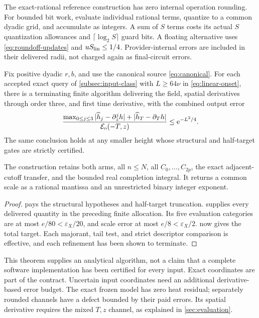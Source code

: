 The exact-rational reference construction has zero internal operation
rounding. For bounded bit work, evaluate individual rational terms,
quantize to a common dyadic grid, and accumulate as integers. A sum of
\(S\) terms costs its actual \(S\) quantization allowances and
\(\lceil\log_2S\rceil\) guard bits. A floating alternative uses
\eqref{eq:roundoff-updates} and \(uS_{\rm lin}\le1/4\).
Provider-internal errors are included in their delivered radii, not
charged again as final-circuit errors.

\begin{theorem}\label{thm:effective}
Fix positive dyadic \(r,b\), and use the canonical source
\eqref{eq:canonical}. For each accepted exact query of
\cref{subsec:input-class} with \(L\ge64\nu\) in
\eqref{eq:linear-onset}, there is a terminating finite algorithm
delivering the field, spatial derivatives through order three, and first
time derivative, with the combined output error
\[
 \frac{\max_{0\le j\le3}|\widehat h_j-\partial_z^jh|
          +|\widehat h_T-\partial_Th|}{\mathcal E_{\mathrm o}(-T,z)}
 \le\mathrm e^{-L^2/4}.
\] The same conclusion holds at any smaller height
whose structural and half-target gates are strictly certified.

The construction retains both arms, all \(n\le N\), all
\(C_0,\ldots,C_{2p}\), the exact adjacent-cutoff transfer, and the
bounded real completion integral. It returns a common scale as a
rational mantissa and an unrestricted binary integer exponent.
\end{theorem}
\begin{proof}
 pays the structural hypotheses and half-target
truncation.  supplies every delivered quantity in
the preceding finite allocation. Its five evaluation categories are
at most \(e/80<\varepsilon_X/20\), and scale error at most
\(e/8<\varepsilon_X/2\).  now gives the total
target. Each majorant, tail test, and strict descriptor comparison is
effective, and each refinement has been shown to terminate.
\end{proof}

This theorem supplies an analytical algorithm, not a claim that a
complete software implementation has been certified for every input.
Exact coordinates are part of the contract. Uncertain input coordinates
need an additional derivative-based error budget. The exact frozen model
has zero heat residual; separately rounded channels have a defect bounded
by their paid errors. Its spatial derivative requires the mixed \(T,z\)
channel, as explained in \cref{sec:evaluation}.

